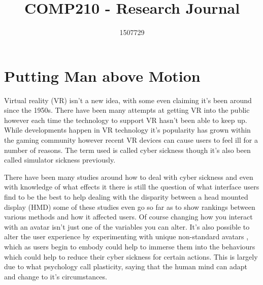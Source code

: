 \documentclass{scrartcl}
\title{COMP210 - Research Journal}
\author{1507729}
\begin{document}
\maketitle


\section{Putting Man above Motion}

Virtual reality (VR) isn't a new idea, with some even claiming it's been around since the 1950s. \cite{vrs2017origin} There have been many attempts at getting VR into the public however each time the technology to support VR hasn't been able to keep up. While developments happen in VR technology it's popularity has grown within the gaming community however recent VR devices can cause users to feel ill for a number of reasons. \cite{porcino2017minimizing} The term used is called cyber sickness though it's also been called simulator sickness \cite{gower1989simulator} previously.

There have been many studies around how to deal with cyber sickness and even with knowledge of what effects it there is still the question of what interface users find to be the best to help dealing with the disparity between a head mounted display (HMD) some of these studies even go so far as to show rankings between various methods and how it affected users. \cite{benzeroual2013cyber, mentzelopoulos2015hardware} Of course changing how you interact with an avatar isn't just one of the variables you can alter. It's also possible to alter the user experience by experimenting with unique non-standard avatars \cite{won2015homuncular}, which as users begin to embody could help to immerse them into the behaviours which could help to reduce their cyber sickness for certain actions. This is largely due to what psychology call plasticity, saying that the human mind can adapt and change to it's circumstances. \cite{madary2016real}
\end{document}
